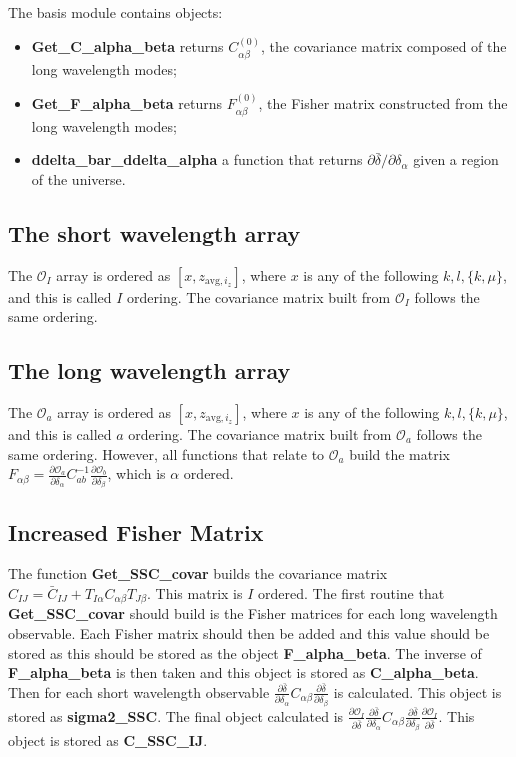 \documentclass[11pt, oneside]{article}   	%
\newcommand{\obs}{\mathcal{O}}
\begin{document}
The basis module contains objects:
\begin{itemize}
\item{\textbf{Get\_C\_alpha\_beta} returns $C_{\alpha \beta}^{(0)}$, the covariance matrix composed of the long wavelength modes;}
\item{ \textbf{Get\_F\_alpha\_beta} returns $F_{\alpha \beta}^{(0)}$, the Fisher matrix constructed from the long wavelength modes;}
\item{ \textbf{ddelta\_bar\_ddelta\_alpha} a function that returns $\partial \bar{\delta}/\partial \delta_\alpha$ given a region of the universe. }
\end{itemize} 

\subsection{The short wavelength array}
The $\mathcal{O}_I$ array is ordered as $[x, z_{\text{avg},i_z}]$, where $x$ is any of the following $k,l,\{k,\mu\}$, and this is called $I$ ordering. The covariance matrix built from $\mathcal{O}_I$ follows the same ordering. 

\subsection{The long wavelength array}
The $\mathcal{O}_a$ array is ordered as $[x, z_{\text{avg},i_z}]$, where $x$ is any of the following $k,l,\{k,\mu\}$, and this is called $a$ ordering. The covariance matrix built from $\mathcal{O}_a$ follows the same ordering. However, all functions that relate to  $\mathcal{O}_a$  build the matrix $F_{\alpha \beta} = \frac{\partial \mathcal{O}_a}{\partial \delta_\alpha} C_{ab}^{-1}  \frac{\partial \mathcal{O}_b}{\partial \delta_\beta}$, which is $\alpha$ ordered. 

\subsection{Increased Fisher Matrix}
The function \textbf{Get\_SSC\_covar} builds the covariance matrix $C_{IJ}= \bar{C}_{IJ} + T_{I\alpha} C_{\alpha \beta} T_{J\beta}$. This matrix is $I$ ordered. 
The first routine that \textbf{Get\_SSC\_covar} should build is the Fisher matrices for each long wavelength observable. Each Fisher matrix should then be added and this value should be stored as this should be stored as the object \textbf{F\_alpha\_beta}. The inverse of \textbf{F\_alpha\_beta} is then taken and this object is stored as \textbf{C\_alpha\_beta}. Then for each short wavelength observable $\frac{\partial \bar{\delta}}{\partial \delta_\alpha} C_{\alpha \beta} \frac{\partial \bar{\delta}}{\partial \delta_\beta}$ is calculated. This object is stored as \textbf{sigma2\_SSC}. The final object calculated is 
$\frac{\partial \obs_I}{\partial \bar{\delta}} \frac{\partial \bar{\delta}}{\partial \delta_\alpha} C_{\alpha \beta} \frac{\partial \bar{\delta}}{\partial \delta_\beta} \frac{\partial \obs_I}{\partial \bar{\delta}}$. This object is stored as \textbf{C\_SSC\_IJ}. 
\end{document}
